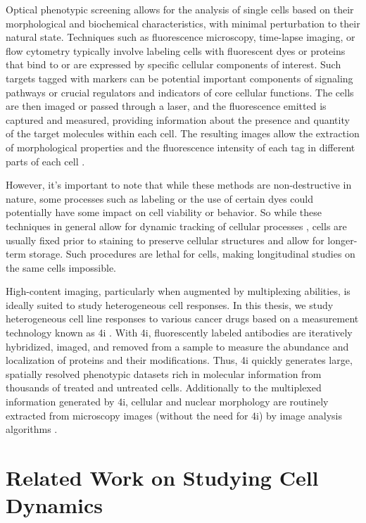 Optical phenotypic screening allows for the analysis of single cells based on their morphological and biochemical characteristics, with minimal perturbation to their natural state. 
Techniques such as fluorescence microscopy, time-lapse imaging, or flow cytometry typically involve labeling cells with fluorescent dyes or proteins that bind to or are expressed by specific cellular components of interest.
Such targets tagged with markers can be potential important components of signaling pathways or crucial regulators and indicators of core cellular functions. 
The cells are then imaged or passed through a laser, and the fluorescence emitted is captured and measured, providing information about the presence and quantity of the target molecules within each cell. 
The resulting images allow the extraction of morphological properties and the fluorescence intensity of each tag in different parts of each cell \citep{carpenter2006cellprofiler}.

However, it's important to note that while these methods are non-destructive in nature, some processes such as labeling or the use of certain dyes could potentially have some impact on cell viability or behavior. So while these techniques in general allow for dynamic tracking of cellular processes \citep{fischer2019inferring, hashimoto2016learning, tvarusko1999time, busch2015fundamental}, cells are usually fixed prior to staining to preserve cellular structures and allow for longer-term storage. Such procedures are lethal for cells, making longitudinal studies on the same cells impossible.

High-content imaging, particularly when augmented by multiplexing abilities, is ideally suited to study heterogeneous cell responses.
In this thesis, we study heterogeneous cell line responses to various cancer drugs based on a measurement technology known as \acrfull{4i} \citep{gut2018multiplexed}.
With 4i, fluorescently labeled antibodies are iteratively hybridized, imaged, and removed from a sample to measure the abundance and localization of proteins and their modifications. 
Thus, 4i quickly generates large, spatially resolved phenotypic datasets rich in molecular information from thousands of treated and untreated cells. Additionally to the multiplexed information generated by 4i, cellular and nuclear morphology are routinely extracted from microscopy images (without the need for 4i) by image analysis algorithms \citep{carpenter2006cellprofiler}.


\section{Related Work on Studying Cell Dynamics}
\label{sec:related_work_bio}

